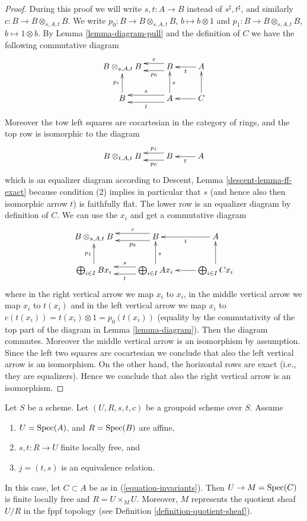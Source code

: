 \begin{proof}
During this proof we will write $s, t : A \to B$ instead of
$s^\sharp, t^\sharp$, and similarly $c : B \to B \otimes_{s, A, t} B$.
We write $p_0 : B \to B \otimes_{s, A, t} B$, $b \mapsto b \otimes 1$ and
$p_1 : B \to B \otimes_{s, A, t} B$, $b \mapsto 1 \otimes b$. By
Lemma \ref{lemma-diagram-pull}
and the definition of $C$ we have the following
commutative diagram
$$
\xymatrix{
B \otimes_{s, A, t} B &
B \ar@<-1ex>[l]_-c \ar@<1ex>[l]^-{p_0} &
A \ar[l]^t \\
B \ar[u]^{p_1} &
A \ar@<-1ex>[l]_s \ar@<1ex>[l]^t \ar[u]_s &
C \ar[u] \ar[l]
}
$$
Moreover the tow left squares are cocartesian in the category of rings, and
the top row is isomorphic to the diagram
$$
\xymatrix{
B \otimes_{t, A, t} B &
B \ar@<-1ex>[l]_-{p_1} \ar@<1ex>[l]^-{p_0} &
A \ar[l]^t
}
$$
which is an equalizer diagram according to
Descent, Lemma \ref{descent-lemma-ff-exact} because condition (2) implies
in particular that $s$ (and hence also then isomorphic arrow $t$)
is faithfully flat.
The lower row is an equalizer diagram by definition of $C$.
We can use the $x_i$ and get a commutative diagram
$$
\xymatrix{
B \otimes_{s, A, t} B &
B \ar@<-1ex>[l]_-c \ar@<1ex>[l]^-{p_0} &
A \ar[l]^t \\
\bigoplus_{i \in I} B x_i \ar[u]^{p_1} &
\bigoplus_{i \in I} A x_i \ar@<-1ex>[l]_s \ar@<1ex>[l]^t \ar[u]_s &
\bigoplus_{i \in I} C x_i \ar[u] \ar[l]
}
$$
where in the right vertical arrow we map $x_i$ to $x_i$,
in the middle vertical arrow we map $x_i$ to $t(x_i)$ and
in the left vertical arrow we map $x_i$ to
$c(t(x_i)) = t(x_i) \otimes 1 = p_0(t(x_i))$ (equality by the commutativity
of the top part of the diagram in Lemma \ref{lemma-diagram}). Then the diagram
commutes. Moreover the middle vertical arrow is an isomorphism
by assumption. Since the left two squares are cocartesian we
conclude that also the left vertical arrow is an isomorphism.
On the other hand, the horizontal rows are exact (i.e., they are
equalizers). Hence we conclude that also the right vertical arrow
is an isomorphism.
\end{proof}

\begin{proposition}
\label{proposition-finite-flat-equivalence}
Let $S$ be a scheme.
Let $(U, R, s, t, c)$ be a groupoid scheme over $S$.
Assume
\begin{enumerate}
\item $U = \mathop{\mathrm{Spec}}(A)$, and $R = \mathop{\mathrm{Spec}}(B)$ are affine,
\item $s, t : R \to U$ finite locally free, and
\item $j = (t, s)$ is an equivalence relation.
\end{enumerate}
In this case, let $C \subset A$ be as in
(\ref{equation-invariants}). Then $U \to M = \mathop{\mathrm{Spec}}(C)$
is finite locally free and $R = U \times_M U$.
Moreover, $M$ represents the quotient sheaf $U/R$
in the fppf topology (see Definition \ref{definition-quotient-sheaf}).
\end{proposition}

